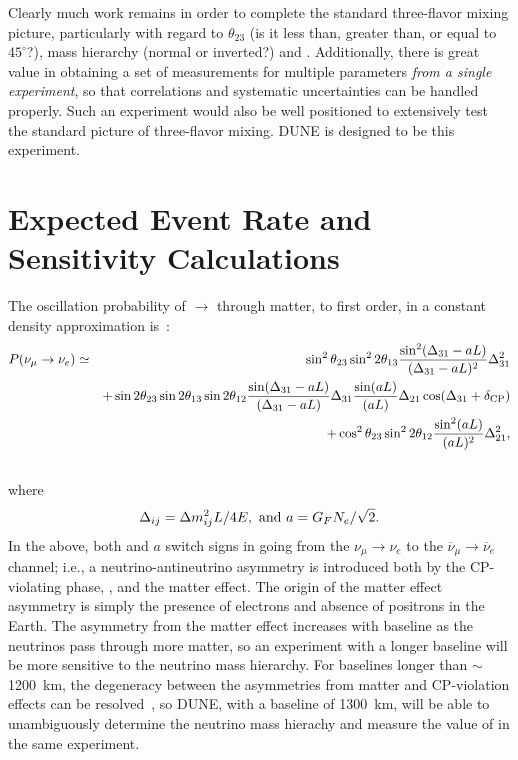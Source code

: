Clearly much work remains in order to complete the standard three-flavor 
mixing picture, particularly 
with regard to $\theta_{23}$ (is it less than, greater than, or equal
to $45^\circ$?), mass hierarchy (normal or inverted?) 
and \deltacp.
Additionally, there is 
great value in obtaining a set of measurements for multiple parameters 
\emph{from a single experiment}, so that correlations and systematic 
uncertainties can be handled properly.  Such an experiment would also be 
well positioned to extensively test the standard picture of three-flavor mixing.  
DUNE is designed to be this experiment.

\section{Expected Event Rate and Sensitivity Calculations}
\label{sec:physics-lbnosc-senscalc}

The oscillation probability of \numu $\rightarrow$ \nue through matter, 
to first order, in a constant density
approximation is~\cite{Nunokawa:2007qh}:
%
\begin{eqnarray}
\label{eq:oscprob}
P(\nu_\mu \rightarrow \nu_e) & \simeq & \sin^2 \theta_{23} \sin^2 2 \theta_{13} 
\frac{ \sin^2(\Delta_{31} - aL)}{(\Delta_{31}-aL)^2} \Delta_{31}^2\\ \nonumber
& & + \sin 2 \theta_{23} \sin 2 \theta_{13} \sin 2 \theta_{12} \frac{ \sin(\Delta_{31} - aL)}{(\Delta_{31}-aL)} \Delta_{31} \frac{\sin(aL)}{(aL)} \Delta_{21} \cos (\Delta_{31} + \mdeltacp)\\ \nonumber
& & + \cos^2 \theta_{23} \sin^2 2 \theta_{12} \frac {\sin^2(aL)}{(aL)^2} \Delta_{21}^2, \\ \nonumber
\end{eqnarray}
%
where 
  \[ \Delta_{ij} = \Delta m^2_{ij} L/4E,\ {\rm and} \ a=G_F N_e /\sqrt{2}. \]
%
In the above, both \deltacp and $a$ 
switch signs in going from the
$\nu_\mu \to \nu_e$ to the $\overline{\nu}_\mu \to \overline{\nu}_e$ channel; i.e.,
a neutrino-antineutrino asymmetry is introduced both by the CP-violating
phase, \deltacp, and the matter effect. The origin of the matter effect asymmetry 
is simply the presence of electrons and absence of positrons in the Earth.  
The asymmetry from the matter effect increases with baseline as the neutrinos
pass through more matter, so an experiment with a longer baseline will be
more sensitive to the neutrino mass hierarchy. For baselines longer than 
$\sim$1200~km, the degeneracy between the asymmetries from matter
and CP-violation effects can be resolved~\cite{Bass:2013vcg}, so DUNE, with a baseline of 1300~km, 
will be able to unambiguously
determine the neutrino mass hierachy and measure the value of \deltacp in the same experiment.


